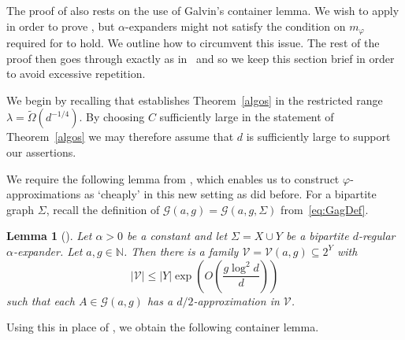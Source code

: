 \documentclass[10pt,a4paper]{amsart}
\newtheorem{lem}[thm]{Lemma}
\theoremstyle{definition}
\newcommand{\cG}{\mathcal{G} }
\newcommand{\cV}{\mathcal{V} }
\newcommand{\beq}[1]{\begin{equation}\label{#1}}
\newcommand{\enq}[0]{\end{equation}}
\newcommand{\0}[0]{\emptyset}
\newcommand{\lam}{\lambda}
\begin{document}
The proof of \cite[Theorem 2]{jenssen2023approximately} also rests on the use of Galvin's container lemma. We wish to apply  in order to prove , but $\alpha$-expanders might not satisfy the condition on $m_\varphi$ required for  to hold. We outline how to circumvent this issue. The rest of the proof then goes through exactly as in~\cite{jenssen2023approximately} and so
we keep this section brief in order to avoid excessive repetition. 

We begin by recalling that \cite[Theorem 2]{jenssen2023approximately} establishes Theorem~\ref{algos} in the restricted range $\lam=\tilde \Omega(d^{-1/4})$. By choosing $C$ sufficiently large in the statement of Theorem~\ref{algos} we may therefore assume that $d$ is sufficiently large to support our assertions. 

We require the following lemma from \cite{jenssen2023approximately}, which enables us to construct $\varphi$-approximations as `cheaply' in this new setting as  did before. For a bipartite graph $\Sigma$, recall the definition of $\cG(a,g)=\cG(a,g,\Sigma)$ from~\eqref{eq:GagDef}.

\begin{lem}[{\cite[Lemma 7]{jenssen2023approximately}}]\label{lem.ess}
	Let $\alpha>0$ be a constant and let $\Sigma=X\cup Y$ be a bipartite $d$-regular $\alpha$-expander. Let $a, g\in \mathbb{N}$. Then there is a family $\cV=\cV(a, g)\subseteq 2^Y$ with
\beq{eq.ess} |\cV|\leq |Y|\exp \left(O\left(\frac{g\log^2 d}{d}\right)\right) \enq
such that each $A\in \cG(a, g)$ has a $d/2$-approximation in $\cV$.
\end{lem}

Using this in place of , we obtain the following container lemma.
\end{document}
